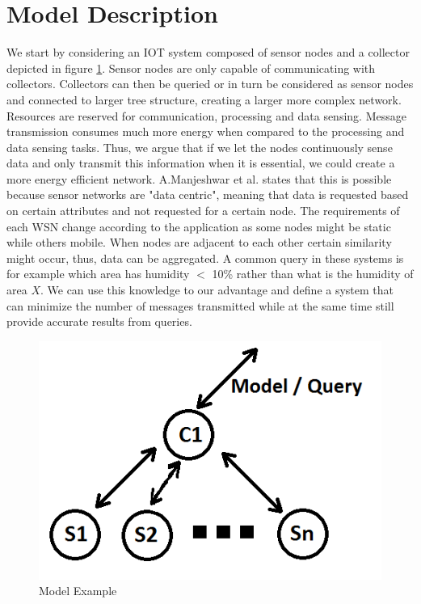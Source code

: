 \documentclass{mproj}
\begin{document}
\section{Model Description}
We start by considering an IOT system composed of sensor nodes and a collector depicted in figure \ref{fig:sn}. Sensor nodes are only capable of communicating with collectors. Collectors can then be queried or in turn be considered as sensor nodes and connected to larger tree structure, creating a larger more complex network. Resources are reserved for communication, processing and data sensing. Message transmission consumes much more energy when compared to the processing and data sensing tasks. \cite{teen} Thus, we argue that if we let the nodes continuously sense data and only transmit this information when it is essential, we could create a more energy efficient network. A.Manjeshwar et al. \cite{teen} states that this is possible because sensor networks are "data centric", meaning that data is requested based on certain attributes and not requested for a certain node. The requirements of each WSN change according to the application as some nodes might be static while others mobile. When nodes are adjacent to each other certain similarity might occur, thus, data can be aggregated. A common query in these systems is for example which area has humidity $<$ 10\% rather than what is the humidity of area $X$. We can use this knowledge to our advantage and define a system that can minimize the number of messages transmitted while at the same time still provide accurate results from queries.

\begin{figure}[H]
\caption{Model Example}
\label{fig:sn}
\centerline{\includegraphics[scale=0.5]{sensornetwork}}
\end{figure}
\end{document}
